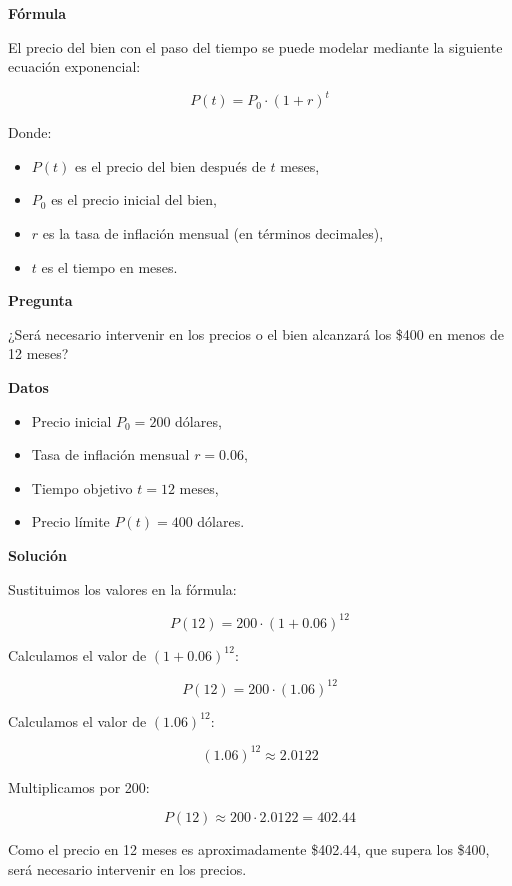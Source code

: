 \documentclass{article}
\begin{document}
\textbf{Fórmula}

El precio del bien con el paso del tiempo se puede modelar mediante la siguiente ecuación exponencial:

\[
P(t) = P_0 \cdot (1 + r)^t
\]

Donde:
\begin{itemize}
    \item \( P(t) \) es el precio del bien después de \( t \) meses,
    \item \( P_0 \) es el precio inicial del bien,
    \item \( r \) es la tasa de inflación mensual (en términos decimales),
    \item \( t \) es el tiempo en meses.
\end{itemize}

\textbf{Pregunta}

¿Será necesario intervenir en los precios o el bien alcanzará los \$400 en menos de 12 meses?

\textbf{Datos}

\begin{itemize}
    \item Precio inicial \( P_0 = 200 \) dólares,
    \item Tasa de inflación mensual \( r = 0.06 \),
    \item Tiempo objetivo \( t = 12 \) meses,
    \item Precio límite \( P(t) = 400 \) dólares.
\end{itemize}

\textbf{Solución}

Sustituimos los valores en la fórmula:

\[
P(12) = 200 \cdot (1 + 0.06)^{12}
\]

Calculamos el valor de \( (1 + 0.06)^{12} \):

\[
P(12) = 200 \cdot (1.06)^{12}
\]

Calculamos el valor de \( (1.06)^{12} \):

\[
(1.06)^{12} \approx 2.0122
\]

Multiplicamos por 200:

\[
P(12) \approx 200 \cdot 2.0122 = 402.44
\]

Como el precio en 12 meses es aproximadamente \$402.44, que supera los \$400, será necesario intervenir en los precios.
\end{document}
